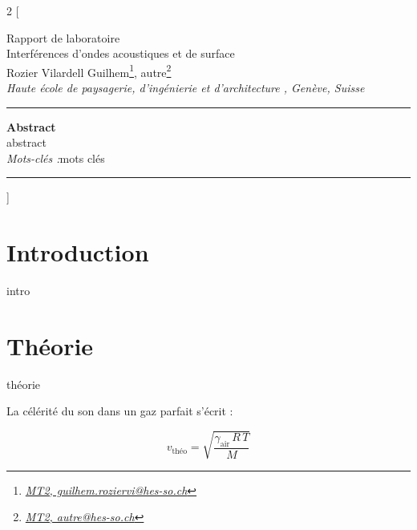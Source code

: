 \documentclass[a4paper,10pt]{article}
\begin{document}

\begin{multicols*}{2}
[ %
%
\begin{center}
\vspace*{0mm}
{\large
Rapport de laboratoire\\
\vspace{3mm}
Interférences d'ondes acoustiques et de surface   %
}\\
\vspace{8mm}
Rozier Vilardell Guilhem\footnote{\textit{\href{guilhem.roziervi@hes-so.ch}{MT2, guilhem.roziervi@hes-so.ch}}},
autre\footnote{\textit{\href{autre@hes-so.ch}{MT2, autre@hes-so.ch}}} 
\\
%
\vspace{3mm}
\footnotesize{
\textit{Haute école de paysagerie, d'ingénierie et d'architecture , Genève, Suisse}
}\\
\vspace{9mm}
\end{center}
%
\rule{\linewidth}{0.4pt} %
\onehalfspacing
\textbf{Abstract}\\
abstract\\
\noindent\textit{Mots-clés :}mots clés\\
\rule{\linewidth}{0.4pt} %
]
\singlespacing

\tableofcontents

\printnomenclature

\setlength{\parskip}{1pt} %

\section{Introduction}

intro
\section{Théorie}

théorie


La célérité du son dans un gaz parfait s'écrit :

\begin{equation}
v_{\mathrm{théo}} = \sqrt{\frac{\gamma_{\mathrm{air}}\,R\,T}{M}}
\label{eq:vson}
\end{equation}


\end{multicols*}
\end{document}
